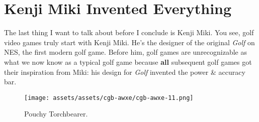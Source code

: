 \documentclass{book}
\begin{document}
\FloatBarrier\needspace{10mm}\section*{Kenji Miki Invented Everything}\nopagebreak[4]

The last thing I want to talk about before I conclude is Kenji Miki. You see, golf video games truly start with Kenji Miki. He’s the designer of the original \emph{Golf} on NES, the first modern golf game. Before him, golf games are unrecognizable as what we now know as a typical golf game because \textbf{all} subsequent golf games got their inspiration from Miki: his design for \emph{Golf} invented the power \& accuracy bar.

\begin{figure}[hbt]
\vskip 10pt
\centering \texttt{[image: assets/assets/cgb-awxe/cgb-awxe-11.png]}\par\pagetwodescription Pouchy Torchbearer.
\vskip 6pt
\end{figure}
\end{document}
